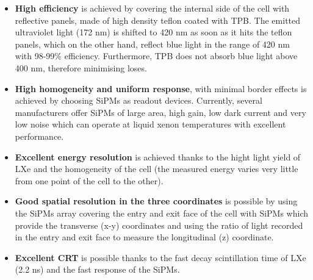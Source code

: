 \begin{itemize} 
\item {\bf High efficiency} is achieved by covering the internal side of the cell with reflective panels, made of high density teflon coated with TPB. The emitted ultraviolet light (172 nm) is shifted to 420 nm as soon as it hits the teflon panels, which on the other hand, reflect blue light in the range of 420 nm with 98-99\% efficiency. Furthermore, TPB does not absorb blue light above 400 nm, therefore minimising loses. 
\item {\bf High homogeneity and uniform response}, with minimal border effects is achieved by choosing SiPMs as readout devices. Currently, several manufacturers offer SiPMs of large area, high gain, low dark current and very low noise which can operate at liquid xenon temperatures with excellent performance.  
\item {\bf Excellent energy resolution} is achieved thanks to the hight light yield of LXe and the homogeneity of the cell (the measured energy varies very little from one point of the cell to the other).  
\item {\bf Good spatial resolution in the three coordinates} is possible by using the SiPMs array covering the entry and exit face of the cell with SiPMs which provide the transverse (x-y) coordinates and using the ratio of light recorded in the entry and exit face to measure the longitudinal (z) coordinate. 
\item {\bf Excellent CRT} is possible thanks to the fast decay scintillation time of LXe (2.2 ns) and the fast response of the SiPMs.  
\end{itemize} 
